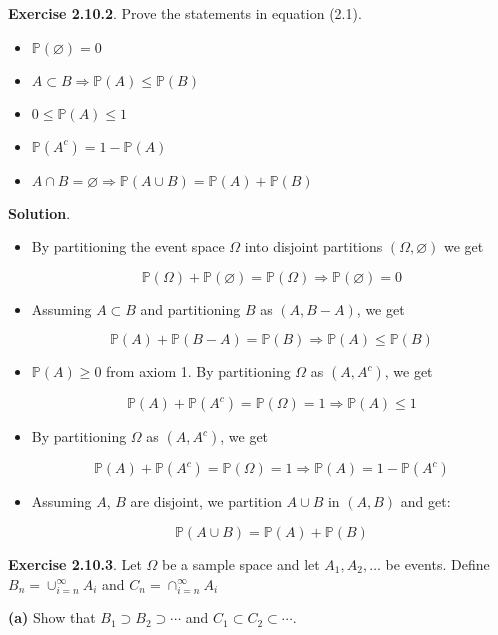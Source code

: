\textbf{Exercise 2.10.2}. Prove the statements in equation (2.1).

\begin{itemize}[tightlist]
\item
  \(\mathbb{P}(\varnothing) = 0\)
\item
  \(A \subset B \Rightarrow \mathbb{P}(A) \leq \mathbb{P}(B)\)
\item
  \(0 \leq \mathbb{P}(A) \leq 1\)
\item
  \(\mathbb{P}\left(A^c\right) = 1 - \mathbb{P}(A)\)
\item
  \(A \cap B = \varnothing \Rightarrow \mathbb{P}(A \cup B) = \mathbb{P}(A) + \mathbb{P}(B)\)
\end{itemize}

\textbf{Solution}.

\begin{itemize}
\item
  By partitioning the event space \(\Omega\) into disjoint partitions
  \((\Omega, \varnothing)\) we get

  \[ \mathbb{P}(\Omega) + \mathbb{P}(\varnothing) = \mathbb{P}(\Omega) \Rightarrow \mathbb{P}(\varnothing) = 0 \]
\item
  Assuming \(A \subset B\) and partitioning \(B\) as \((A, B - A)\), we
  get

  \[ \mathbb{P}(A) + \mathbb{P}(B - A) = \mathbb{P}(B) \Rightarrow \mathbb{P}(A) \leq \mathbb{P}(B) \]
\item
  \(\mathbb{P}(A) \geq 0\) from axiom 1. By partitioning \(\Omega\) as
  \((A, A^c)\), we get

  \[ \mathbb{P}(A) + \mathbb{P}(A^c) = \mathbb{P}(\Omega) = 1 \Rightarrow \mathbb{P}(A) \leq 1 \]
\item
  By partitioning \(\Omega\) as \((A, A^c)\), we get

  \[ \mathbb{P}(A) + \mathbb{P}(A^c) = \mathbb{P}(\Omega) = 1 \Rightarrow \mathbb{P}(A) = 1 - \mathbb{P}(A^c) \]
\item
  Assuming \(A\), \(B\) are disjoint, we partition \(A \cup B\) in
  \((A, B)\) and get:

  \[ \mathbb{P}(A \cup B) = \mathbb{P}(A) + \mathbb{P}(B) \]
\end{itemize}

\textbf{Exercise 2.10.3}. Let \(\Omega\) be a sample space and let
\(A_1, A_2, \dots\) be events. Define \(B_n = \cup_{i=n}^\infty A_i\)
and \(C_n = \cap_{i=n}^\infty A_i\)

\textbf{(a)} Show that \(B_1 \supset B_2 \supset \cdots\) and
\(C_1 \subset C_2 \subset \cdots\).

